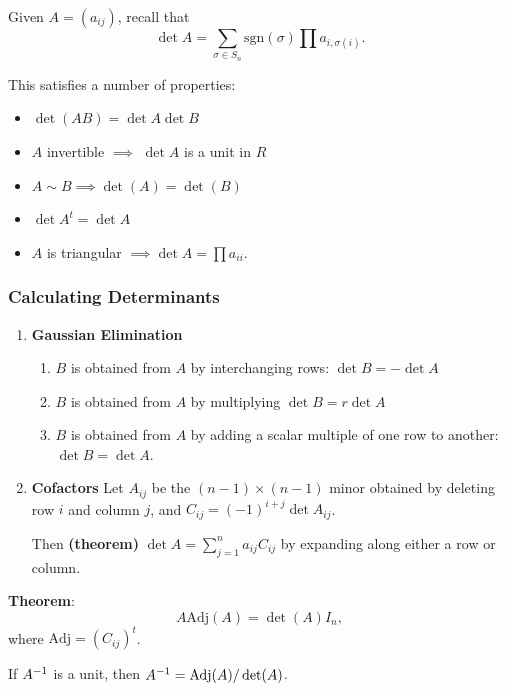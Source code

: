 Given \(A = (a_{ij})\), recall that \[
\det A = \sum_{\sigma \in S_n} \mathrm{sgn}(\sigma) \prod a_{i, \sigma(i)}
.\]

This satisfies a number of properties:

\begin{itemize}
\item
  \(\det(AB) = \det A \det B\)
\item
  \(A\) invertible \(\implies\) \(\det A\) is a unit in \(R\)
\item
  \(A \sim B \implies \det(A) = \det(B)\)
\item
  \(\det A^t = \det A\)
\item
  \(A\) is triangular \(\implies \det A = \prod a_{ii}\).
\end{itemize}

\hypertarget{calculating-determinants}{%
\subsubsection{Calculating
Determinants}\label{calculating-determinants}}

\begin{enumerate}
\def\labelenumi{\arabic{enumi}.}
\item
  \textbf{Gaussian Elimination}

  \begin{enumerate}
  \def\labelenumii{\alph{enumii}.}
  \item
    \(B\) is obtained from \(A\) by interchanging rows:
    \(\det B = -\det A\)
  \item
    \(B\) is obtained from \(A\) by multiplying \(\det B = r \det A\)
  \item
    \(B\) is obtained from \(A\) by adding a scalar multiple of one row
    to another: \(\det B = \det A\).
  \end{enumerate}
\item
  \textbf{Cofactors} Let \(A_{ij}\) be the \((n-1)\times (n-1)\) minor
  obtained by deleting row \(i\) and column \(j\), and
  \(C_{ij} = (-1)^{i+j} \det A_{ij}\).

  Then \textbf{(theorem)} \(\det A = \sum_{j=1}^n a_{ij} C_{ij}\) by
  expanding along either a row or column.
\end{enumerate}

\textbf{Theorem}: \[
A \mathrm{Adj}(A) = \det (A) I_n
,\] where \(\mathrm{Adj} = (C_{ij})^t\).

If \(A^{-1}\) is a unit, then \(A^{-1} = \mathrm{Adj}(A) / \det(A)\).

